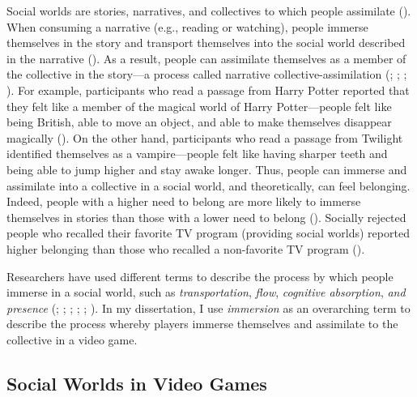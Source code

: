 \documentclass[
]{udthesis}
\begin{document}
Social worlds are stories, narratives, and collectives to which people
assimilate (). When consuming a narrative (e.g., reading or
watching), people immerse themselves in the story and transport
themselves into the social world described in the narrative
(). As a result, people can assimilate themselves as a
member of the collective in the story---a process called narrative
collective-assimilation (; ; ; ). For example, participants who read a passage from Harry
Potter reported that they felt like a member of the magical world of
Harry Potter---people felt like being British, able to move an object,
and able to make themselves disappear magically (). On the
other hand, participants who read a passage from Twilight identified
themselves as a vampire---people felt like having sharper teeth and
being able to jump higher and stay awake longer. Thus, people can
immerse and assimilate into a collective in a social world, and
theoretically, can feel belonging. Indeed, people with a higher need to
belong are more likely to immerse themselves in stories than those with
a lower need to belong (). Socially rejected people who
recalled their favorite TV program (providing social worlds) reported
higher belonging than those who recalled a non-favorite TV program
().

Researchers have used different terms to describe the process by which
people immerse in a social world, such as \emph{transportation}, \emph{flow},
\emph{cognitive absorption}, \emph{and} \emph{presence} (; ; ; ; ; ).
In my dissertation, I use \emph{immersion} as an overarching term to describe
the process whereby players immerse themselves and assimilate to the
collective in a video game.

\subsection{Social Worlds in Video Games}\label{social-worlds-in-video-games}
\end{document}
